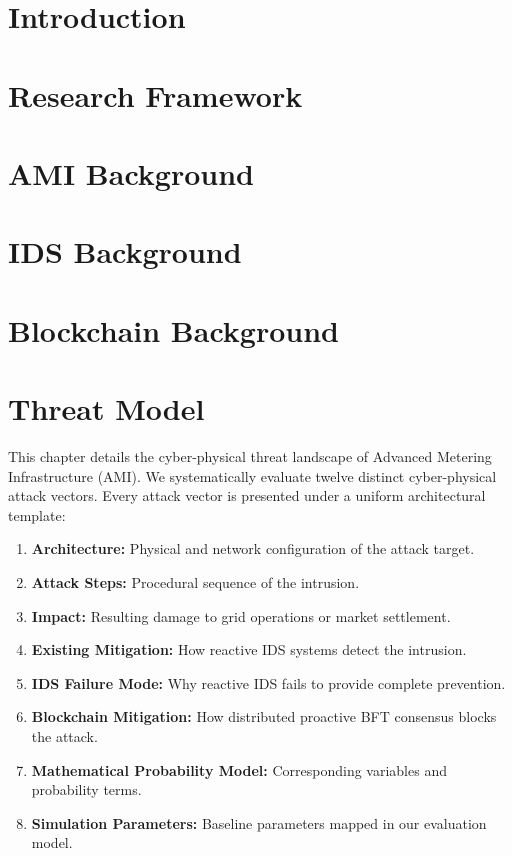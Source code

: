 \documentclass[12pt, oneside, a4paper]{report}
\theoremstyle{definition}
\theoremstyle{remark}
\begin{document}
\chapter{Introduction}
\label{ch:introduction}

\chapter{Research Framework}
\label{ch:research_framework}

\chapter{AMI Background}
\label{ch:ami_background}

\chapter{IDS Background}
\label{ch:ids_background}

\chapter{Blockchain Background}
\label{ch:blockchain_background}

\chapter{Threat Model}
\label{ch:threat_model}

This chapter details the cyber-physical threat landscape of Advanced Metering Infrastructure (AMI). We systematically evaluate twelve distinct cyber-physical attack vectors. Every attack vector is presented under a uniform architectural template:
\begin{enumerate}[label=(\roman*)]
  \item \textbf{Architecture:} Physical and network configuration of the attack target.
  \item \textbf{Attack Steps:} Procedural sequence of the intrusion.
  \item \textbf{Impact:} Resulting damage to grid operations or market settlement.
  \item \textbf{Existing Mitigation:} How reactive IDS systems detect the intrusion.
  \item \textbf{IDS Failure Mode:} Why reactive IDS fails to provide complete prevention.
  \item \textbf{Blockchain Mitigation:} How distributed proactive BFT consensus blocks the attack.
  \item \textbf{Mathematical Probability Model:} Corresponding variables and probability terms.
  \item \textbf{Simulation Parameters:} Baseline parameters mapped in our evaluation model.
\end{enumerate}
\end{document}
